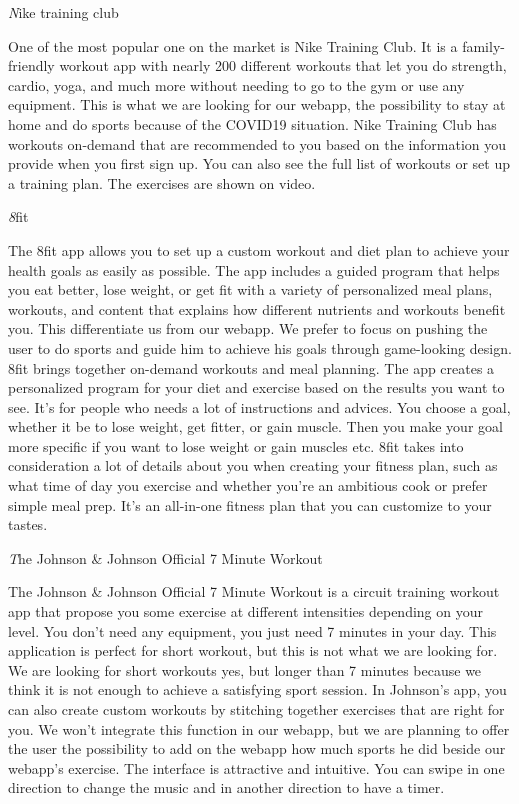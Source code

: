 \documentclass[conference]{IEEEtran}
\begin{document}
\begin{flushleft}
    \textit
    Nike training club 
\end{flushleft}
One of the most popular one on the market is Nike Training Club. It is a family-friendly workout app with nearly 200 different workouts that let you do strength, cardio, yoga, and much more without needing to go to the gym or use any equipment. This is what we are looking for our webapp, the possibility to stay at home and do sports because of the COVID19 situation. Nike Training Club has workouts on-demand that are recommended to you based on the information you provide when you first sign up. You can also see the full list of workouts or set up a training plan. The exercises are shown on video. 

\begin{flushleft}
    \textit
    8fit  
\end{flushleft}
The 8fit app allows you to set up a custom workout and diet plan to achieve your health goals as easily as possible. The app includes a guided program that helps you eat better, lose weight, or get fit with a variety of personalized meal plans, workouts, and content that explains how different nutrients and workouts benefit you. This differentiate us from our webapp. We prefer to focus on pushing the user to do sports and guide him to achieve his goals through game-looking design. 8fit brings together on-demand workouts and meal planning. The app creates a personalized program for your diet and exercise based on the results you want to see. It's for people who needs a lot of instructions and advices. You choose a goal, whether it be to lose weight, get fitter, or gain muscle. Then you make your goal more specific if you want to lose weight or gain muscles etc. 8fit takes into consideration a lot of details about you when creating your fitness plan, such as what time of day you exercise and whether you're an ambitious cook or prefer simple meal prep. It's an all-in-one fitness plan that you can customize to your tastes. 


\begin{flushleft}
    \textit
    The Johnson & Johnson Official 7 Minute Workout 
\end{flushleft}
The Johnson & Johnson Official 7 Minute Workout is a circuit training workout app that propose you some exercise at different intensities depending on your level. You don’t need any equipment, you just need 7 minutes in your day. This application is perfect for short workout, but this is not what we are looking for. We are looking for short workouts yes, but longer than 7 minutes because we think it is not enough to achieve a satisfying sport session. In Johnson’s app, you can also create custom workouts by stitching together exercises that are right for you. We won’t integrate this function in our webapp, but we are planning to offer the user the possibility to add on the webapp how much sports he did beside our webapp’s exercise. The interface is attractive and intuitive. You can swipe in one direction to change the music and in another direction to have a timer.
\end{document}
